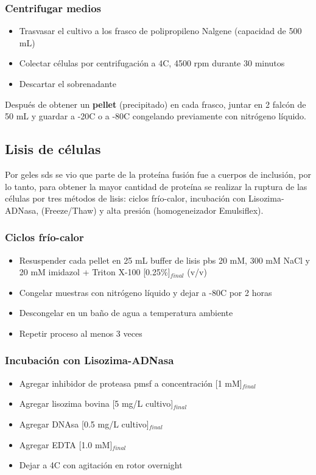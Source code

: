 \begin{appendix}
\subsubsection{Centrifugar medios}
    \begin{itemize}
        \item{Trasvasar el cultivo a los frasco de polipropileno Nalgene (capacidad de 500 mL)}
        \item{Colectar células por centrifugación a 4\textdegree C, 4500 \ac{rpm} durante 30 minutos}
        \item{Descartar el sobrenadante}
    \end{itemize}

Después de obtener un \textbf{pellet} (precipitado) en cada frasco, juntar en 2 falcón de 50 mL y guardar a -20\textdegree C o a -80\textdegree C congelando previamente con nitrógeno líquido.

\subsection{Lisis de células}
Por geles \ac{sds} se vio que parte de la proteína fusión fue a cuerpos de inclusión, por lo tanto, para obtener la mayor cantidad de proteína se realizar la ruptura de las células por tres métodos de lisis: ciclos frío-calor, incubación con Lisozima-ADNasa, (Freeze/Thaw) y alta presión (homogeneizador Emulsiflex).

\subsubsection{Ciclos frío-calor}
     \begin{itemize}
         \item{Resuspender cada pellet en 25 mL buffer de lisis \ac{pbs} 20 mM, 300 mM NaCl y 20 mM imidazol} + Triton X-100 [0.25\%]$_{final}$ (v/v)
        \item{Congelar muestras con nitrógeno líquido y dejar a -80\textdegree C por 2 horas}
        \item{Descongelar en un baño de agua a temperatura ambiente}
        \item{Repetir proceso al menos 3 veces}
    \end{itemize}

\subsubsection{Incubación con Lisozima-ADNasa}
     \begin{itemize}
        \item{Agregar inhibidor de proteasa \ac{pmsf} a concentración [1 mM]$_{final}$}
        \item{Agregar lisozima bovina [5 mg/L cultivo]$_{final}$}
        \item{Agregar DNAsa [0.5 mg/L cultivo]$_{final}$}
        \item{Agregar EDTA [1.0 mM]$_{final}$}
        \item{Dejar a 4\textdegree C con agitación en rotor overnight}
    \end{itemize}


\end{appendix}
